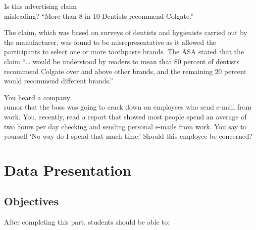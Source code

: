 \documentclass[11pt]{book}\usepackage[]{graphicx}\usepackage[]{color}
\begin{document}
\begin{exercises}
\begin{exercise}   %

Is this advertising claim \\ misleading?
``More than 8 in 10 Dentists recommend Colgate.''

\end{exercise}
\begin{solution}    %

The claim, which was based on surveys of dentists and hygienists carried out by the manufacturer, was found to be misrepresentative as it allowed the participants to select one or more toothpaste brands. The ASA stated that the claim ``… would be understood by readers to mean that 80 percent of dentists recommend Colgate over and above other brands, and the remaining 20 percent would recommend different brands.''

\end{solution}

\begin{exercise}   %

You heard a company \\ rumor that the boss was going to crack down on employees who send e-mail from work.  You, recently, read a report that showed most people spend an average of two hours per day checking and sending personal e-mails from work.  You say to yourself `No way do I spend that much time.'  Should this employee be concerned?

\end{exercise}
\begin{solution}    %

\end{solution}


\end{exercises}

\onecolumn




\chapter{Data Presentation}
\label{chap:ch2}

\section{Objectives}

After completing this part, students should be able to:
\end{document}
